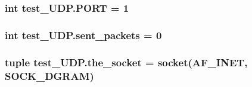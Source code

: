 \subsubsection[{P\+O\+R\+T}]{\setlength{\rightskip}{0pt plus 5cm}int test\+\_\+\+U\+D\+P.\+P\+O\+R\+T = 1}\label{namespacetest__UDP_a71a28a5e1d87bb9d20b4860f8c1ae9e5}
\hypertarget{namespacetest__UDP_adb04d009f2831eafc2dd425da9037702}{}
\subsubsection[{sent\+\_\+packets}]{\setlength{\rightskip}{0pt plus 5cm}int test\+\_\+\+U\+D\+P.\+sent\+\_\+packets = 0}\label{namespacetest__UDP_adb04d009f2831eafc2dd425da9037702}
\hypertarget{namespacetest__UDP_a03630c1b0548a6558e82b970aed36de1}{}
\subsubsection[{the\+\_\+socket}]{\setlength{\rightskip}{0pt plus 5cm}tuple test\+\_\+\+U\+D\+P.\+the\+\_\+socket = socket(A\+F\+\_\+\+I\+N\+E\+T, S\+O\+C\+K\+\_\+\+D\+G\+R\+A\+M)}\label{namespacetest__UDP_a03630c1b0548a6558e82b970aed36de1}
